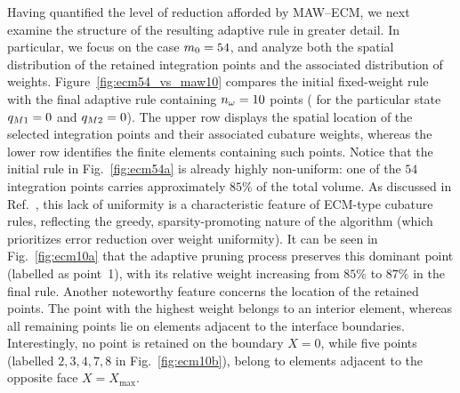 \documentclass[11pt,a4paper]{article}
\begin{document}
Having quantified the level of reduction afforded by MAW--ECM, we next examine the structure of the resulting adaptive rule in greater detail. In particular, we focus on the case $m_0=54$, and analyze both the spatial distribution of the retained integration points and the associated distribution of weights.
Figure~\ref{fig:ecm54_vs_maw10} compares the initial fixed-weight rule   with the final adaptive rule containing $n_{\omega}=10$ points (  for the particular state $q_{M1}=0$ and $q_{M2}=0$). The upper row displays the spatial location of the selected integration points and their associated cubature weights, whereas the lower row identifies the finite elements containing such points. Notice that the initial rule in Fig.~\ref{fig:ecm54a} is already highly non-uniform: one of the $54$ integration points carries approximately $85\%$ of the total volume. As discussed in Ref.~\cite{hernandez2024cecm}, this lack of uniformity is a characteristic feature of ECM-type cubature rules, reflecting the greedy, sparsity-promoting nature of the algorithm (which prioritizes error reduction over weight uniformity). It can be seen in Fig.~\ref{fig:ecm10a} that the adaptive pruning process preserves this dominant point (labelled as point~1), with its relative weight   increasing from $85\%$ to $87\%$ in the final rule. Another noteworthy feature concerns the location of the retained points. The point with the highest weight   belongs to an interior element, whereas all remaining points lie on elements adjacent to the interface boundaries. Interestingly, no point is retained on the boundary $X=0$, while five points (labelled ${2,3,4,7,8}$ in Fig.~\ref{fig:ecm10b}), belong to elements adjacent to the opposite face  $X=X_{\max}$.
\end{document}
